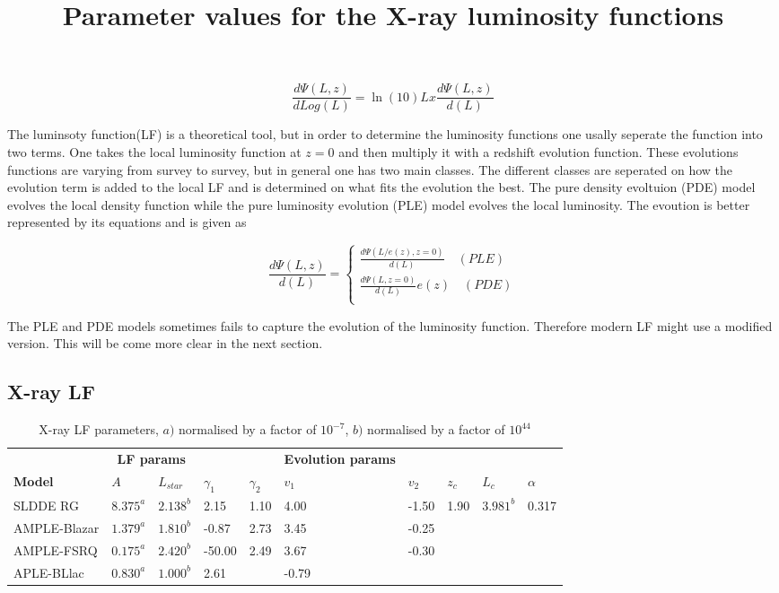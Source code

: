 \documentclass{article}
\begin{document}
\begin{equation}
    \frac{d\Psi(L,z)}{dLog(L)} =  \ln (10)  Lx \frac{d\Psi(L,z)}{d(L)}
\end{equation}


The luminsoty function(LF) is a theoretical tool, but in order to determine the luminosity functions one usally seperate the function into two terms. 
One takes the local luminosity function at $z=0$ and then multiply it with a redshift evolution function. These evolutions functions
are varying from survey to survey, but in general one has two main classes. 
The different classes are seperated on how the evolution term is added to the local LF and is determined on what fits the evolution the best. 
The pure density evoltuion (PDE) model evolves the local density function while the pure luminosity evolution (PLE) model evolves the local luminosity.
The evoution is better represented by its equations and is given as 

\begin{equation}\frac{d\Psi(L,z)}{d(L)} = 
    \begin{cases}
        \frac{d\Psi(L/e(z),z=0)}{d(L)} \quad (PLE)\\
        \frac{d\Psi(L,z=0)}{d(L)}e(z) \quad (PDE)\\
    \end{cases}
\end{equation}

The PLE and PDE models sometimes fails to capture the evolution of the luminosity function. Therefore modern 
LF might use a modified version. This will be come more clear in the next section.

\subsection{X-ray LF}

\begin{table}
\centering
\title{Parameter values for the X-ray luminosity functions}
\begin{tabularx}{\textwidth}{|l|XXXX|XXXXX|}
\hline

& \multicolumn{2}{c}{\textbf{LF params}} &&&  \textbf{Evolution params} &&&&\\

\textbf{Model} & $A$ & $L_{star}$ & $\gamma _1$ &  $\gamma _2$  & $v_1$ & $v_2$ & $z_c$ & $L_c$ & $ \alpha$\\
\hline
SLDDE RG & $8.375^a$ & $2.138^b$ & 2.15 & 1.10 & 4.00 & -1.50 & 1.90 & $3.981^b$ & 0.317  \\

AMPLE-Blazar & $1.379^a$ & $1.810^b$ & -0.87 & 2.73 & 3.45 & -0.25 & & &  \\

AMPLE-FSRQ & $0.175^a$ & $2.420^b$ & -50.00 & 2.49 & 3.67 & -0.30 & & &  \\

APLE-BLlac & $0.830^a$& $1.000^b$ & 2.61 & &-0.79& & & &  \\
\hline
\end{tabularx}
\caption{X-ray LF parameters, $a)$ normalised by a factor of $10^{-7}$, $b)$ normalised by a factor of $10^{44}$}
\label{tab:xray_lf}
\end{table}
\end{document}
